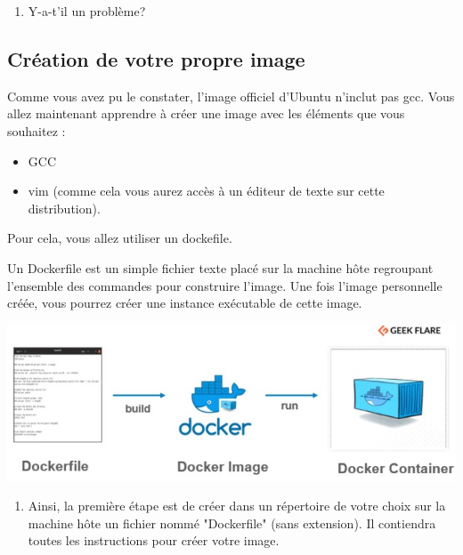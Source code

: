 \documentclass[french, 12pt]{article}%
\newcommand{\itemE}{\item[$\bullet$]}
\newcommand{\titreencadre}{Titre}
\newenvironment{encadre}[1]{\renewcommand{\titreencadre}{#1}
	\begin{mdframed}[style=encadrestyle]
	\vspace{0.5\baselineskip}
	}{%
	\end{mdframed}}
\begin{document}
 
\begin{enumerate}[resume]
\item Y-a-t'il un problème? 
\end{enumerate}

\subsection{Création de votre propre image}

Comme vous avez pu le constater, l'image officiel d'Ubuntu n'inclut pas gcc. Vous allez maintenant apprendre à créer une image avec les éléments que vous souhaitez : 
\begin{itemize}
\itemE GCC
\itemE vim (comme cela vous aurez accès à un éditeur de texte sur cette distribution). 
\end{itemize}

Pour cela, vous allez utiliser un dockefile. 

\begin{encadre}{Dockerfile}
Un Dockerfile est un simple fichier texte placé sur la machine hôte regroupant l'ensemble des commandes pour construire l'image. Une fois l'image personnelle créée, vous pourrez créer une instance exécutable de cette image.
\end{encadre}

\begin{center}
\includegraphics[scale=0.7]{./ressource/docker_file_schema.jpg}
\end{center}

\begin{enumerate}
\item Ainsi, la première étape est de créer dans un répertoire de votre choix sur la machine hôte un fichier nommé "Dockerfile" (sans extension). Il contiendra toutes les instructions pour créer votre image. 
\end{enumerate}
\end{document}
